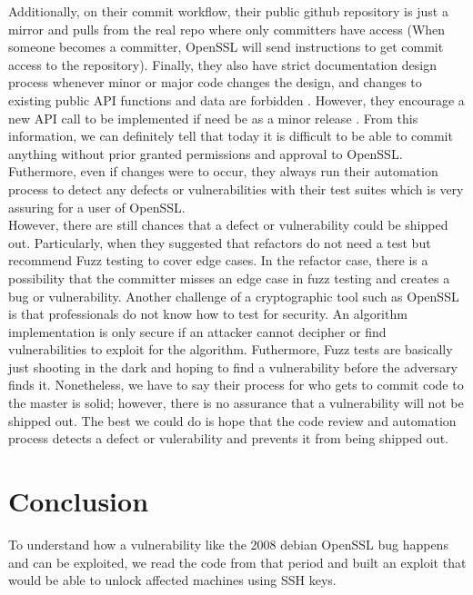 \documentclass[conference]{IEEEtran}
\begin{document}
    Additionally, on their commit workflow, their public github
    repository is just a mirror and pulls from the real repo where
    only committers have access\cite{7} (When someone becomes a
    committer, OpenSSL will send instructions to get commit access to
    the repository\cite{7}).  Finally, they also have strict
    documentation design process whenever minor or major code changes
    the design, and changes to existing public API functions and data
    are forbidden \cite{9}. However, they encourage a new API call to
    be implemented if need be as a minor release \cite{9}. From this
    information, we can definitely tell that today it is difficult to
    be able to commit anything without prior granted permissions and
    approval to OpenSSL. Futhermore, even if changes were to occur,
    they always run their automation process to detect any defects or
    vulnerabilities with their test suites which is very assuring for
    a user of OpenSSL.
    \\

    \quad However, there are still chances that a defect or
    vulnerability could be shipped out. Particularly, when they
    suggested that refactors do not need a test but recommend Fuzz
    testing to cover edge cases. In the refactor case, there is a
    possibility that the committer misses an edge case in fuzz testing
    and creates a bug or vulnerability.  Another challenge of a
    cryptographic tool such as OpenSSL is that professionals do not
    know how to test for security. An algorithm implementation is only
    secure if an attacker cannot decipher or find vulnerabilities to
    exploit for the algorithm. Futhermore, Fuzz tests are basically
    just shooting in the dark and hoping to find a vulnerability
    before the adversary finds it.  Nonetheless, we have to say their
    process for who gets to commit code to the master is solid;
    however, there is no assurance that a vulnerability will not be
    shipped out.  The best we could do is hope that the code review
    and automation process detects a defect or vulerability and
    prevents it from being shipped out.

\section{Conclusion}
To understand how a vulnerability like the 2008 debian OpenSSL bug
happens and can be exploited, we read the code from that period and
built an exploit that would be able to unlock affected machines using
SSH keys.
\end{document}
